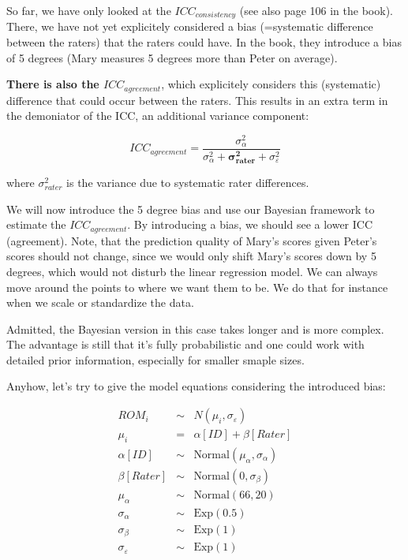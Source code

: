 \documentclass[
]{book}
\begin{document}
So far, we have only looked at the \textbf{\(ICC_{consistency}\)} (see also page 106 in the book).
There, we have not yet explicitely considered a bias (=systematic difference
between the raters) that the raters could have. In the book,
they introduce a bias of 5 degrees (Mary measures 5 degrees more than Peter on average).

\textbf{There is also the \(ICC_{agreement}\)}, which explicitely considers this
(systematic) difference that could occur between the raters.
This results in an extra term in the demoniator
of the ICC, an additional variance component:

\[ ICC_{agreement} = \frac{\sigma_{\alpha}^2}{\sigma_{\alpha}^2 + 
\mathbf{\sigma_{rater}^2} + \sigma_{\varepsilon}^2}\]

where \(\sigma_{rater}^2\) is the variance due to systematic rater differences.

We will now introduce the 5 degree bias and use our Bayesian
framework to estimate the \(ICC_{agreement}\).
By introducing a bias, we should see
a lower ICC (agreement). Note, that the prediction quality of Mary's scores
given Peter's scores should not change, since we would only shift Mary's scores
down by 5 degrees, which would not disturb the linear regression model. We can
always move around the points to where we want them to be. We do that for instance
when we scale or standardize the data.

Admitted, the Bayesian version in this case takes longer and is more complex.
The advantage is still that it's fully probabilistic and one could work with
detailed prior information, especially for smaller smaple sizes.

Anyhow, let's try to give the model equations considering
the introduced bias:

\[
\begin{array}{rcl}
ROM_i &\sim& N(\mu_i, \sigma_{\varepsilon}) \\
\mu_i &=& \alpha[ID] + \beta[Rater] \\
\alpha[ID] &\sim& \text{Normal}(\mu_{\alpha}, \sigma_{\alpha}) \\
\beta[Rater] &\sim& \text{Normal}(0, \sigma_{\beta}) \\
\mu_{\alpha} &\sim& \text{Normal}(66, 20) \\
\sigma_{\alpha} &\sim& \text{Exp}(0.5) \\
\sigma_{\beta} &\sim& \text{Exp}(1) \\
\sigma_{\varepsilon} &\sim& \text{Exp}(1)
\end{array}
\]
\end{document}
